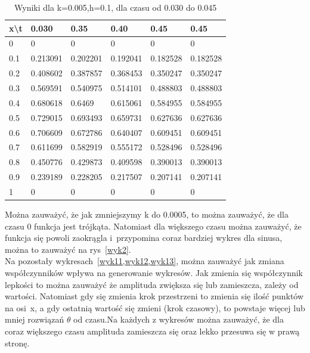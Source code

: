 \documentclass[a4paper,12pt]{article}
\begin{document}
	\begin{table}[]
		\begin{tabular}{|l|l|l|l|l|l|}
			\hline
			x\textbackslash{}t & 0.030    & 0.35     & 0.40     & 0.45     & 0.45     \\ \hline
			0                  & 0        & 0        & 0        & 0        & 0        \\ \hline
			0.1                & 0.213091 & 0.202201 & 0.192041 & 0.182528 & 0.182528 \\ \hline
			0.2                & 0.408602 & 0.387857 & 0.368453 & 0.350247 & 0.350247 \\ \hline
			0.3                & 0.569591 & 0.540975 & 0.514101 & 0.488803 & 0.488803 \\ \hline
			0.4                & 0.680618 & 0.6469   & 0.615061 & 0.584955 & 0.584955 \\ \hline
			0.5                & 0.729015 & 0.693493 & 0.659731 & 0.627636 & 0.627636 \\ \hline
			0.6                & 0.706609 & 0.672786 & 0.640407 & 0.609451 & 0.609451 \\ \hline
			0.7                & 0.611699 & 0.582919 & 0.555172 & 0.528496 & 0.528496 \\ \hline
			0.8                & 0.450776 & 0.429873 & 0.409598 & 0.390013 & 0.390013 \\ \hline
			0.9                & 0.239189 & 0.228205 & 0.217507 & 0.207141 & 0.207141 \\ \hline
			1                  & 0        & 0        & 0        & 0        & 0        \\ \hline
		\end{tabular}
		\caption{Wyniki dla k=0.005,h=0.1, dla czasu od 0.030 do 0.045}
		\label{tab2}
	\end{table}
	Można zauważyć, że jak zmniejszymy k do 0.0005, to można zauważyć, że dla czasu 0 funkcja jest trójkąta. Natomiast dla większego czasu można zauważyć, że funkcja się powoli zaokrągla i~przypomina coraz bardziej wykres dla sinusa, można to zauważyć na rys~\ref{wyk2}. \\
	Na pozostały wykresach~\ref{wyk11,wyk12,wyk13}, można zauważyć jak zmiana współczynników wpływa na generowanie wykresów. Jak zmienia się współczynnik lepkości to można zauważyć że amplituda zwiększa się lub zamieszcza, zależy od wartości. Natomiast gdy się zmienia krok przestrzeni to zmienia się ilość punktów na osi~x, a gdy ostatnią wartość się zmieni (krok czasowy), to powstaje więcej lub mniej rozwiązań $\theta$ od czasu.Na każdych z wykresów można zauważyć, że dla coraz większego czasu amplituda zamieszcza się oraz lekko przesuwa się w prawą stronę.\\
\end{document}
